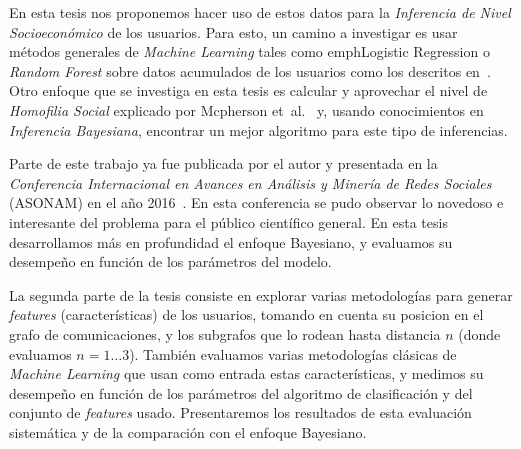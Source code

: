 \documentclass{article}
\begin{document}
En esta tesis nos proponemos hacer uso de estos datos para la \emph{Inferencia de Nivel Socioeconómico} de los usuarios. Para esto, un camino a investigar es usar métodos generales de \emph{Machine Learning} tales como emph{Logistic Regression} o \emph{Random Forest} sobre datos acumulados de los usuarios como los descritos en~\cite{oskarsdottir2016}. Otro enfoque que se investiga en esta tesis es calcular y aprovechar el nivel de \emph{Homofilia Social} explicado por Mcpherson et~al.~\cite{mcpherson2001birds} y, usando conocimientos en \emph{Inferencia Bayesiana}, encontrar un mejor algoritmo para este tipo de inferencias.

Parte de este trabajo ya fue publicada por el autor y presentada en la \emph{Conferencia Internacional en Avances en Análisis y Minería de Redes Sociales} (ASONAM) en el año 2016~\cite{fixmanasonam2016}. En esta conferencia se pudo observar lo novedoso e interesante del problema para el público científico general.
En esta tesis desarrollamos más en profundidad el enfoque Bayesiano, y evaluamos su desempeño en función de los parámetros del modelo.

La segunda parte de la tesis consiste en explorar varias metodologías para generar \emph{features} (características) de los usuarios, tomando en cuenta su posicion en el grafo de comunicaciones, y los subgrafos que lo rodean hasta distancia $n$ (donde evaluamos $n = 1 \ldots 3$). También evaluamos varias metodologías clásicas de \emph{Machine Learning} que usan como entrada estas características, y medimos su desempeño en función de los parámetros del algoritmo de clasificación y del conjunto de \emph{features} usado. Presentaremos los resultados de esta evaluación sistemática y de la comparación con el enfoque Bayesiano.

{}
\end{document}
